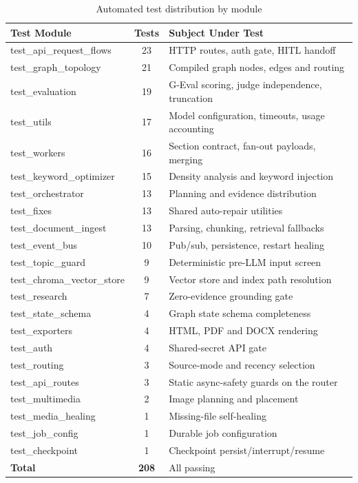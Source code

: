 \begin{table}[ht]
    \centering
    \renewcommand{\arraystretch}{1.25}
    \begin{tabular}{|l|c|l|}
        \hline
        \textbf{Test Module} & \textbf{Tests} & \textbf{Subject Under Test} \\
        \hline
        test\_api\_request\_flows & 23 & HTTP routes, auth gate, HITL handoff \\
        test\_graph\_topology & 21 & Compiled graph nodes, edges and routing \\
        test\_evaluation & 19 & G-Eval scoring, judge independence, truncation \\
        test\_utils & 17 & Model configuration, timeouts, usage accounting \\
        test\_workers & 16 & Section contract, fan-out payloads, merging \\
        test\_keyword\_optimizer & 15 & Density analysis and keyword injection \\
        test\_orchestrator & 13 & Planning and evidence distribution \\
        test\_fixes & 13 & Shared auto-repair utilities \\
        test\_document\_ingest & 13 & Parsing, chunking, retrieval fallbacks \\
        test\_event\_bus & 10 & Pub/sub, persistence, restart healing \\
        test\_topic\_guard & 9 & Deterministic pre-LLM input screen \\
        test\_chroma\_vector\_store & 9 & Vector store and index path resolution \\
        test\_research & 7 & Zero-evidence grounding gate \\
        test\_state\_schema & 4 & Graph state schema completeness \\
        test\_exporters & 4 & HTML, PDF and DOCX rendering \\
        test\_auth & 4 & Shared-secret API gate \\
        test\_routing & 3 & Source-mode and recency selection \\
        test\_api\_routes & 3 & Static async-safety guards on the router \\
        test\_multimedia & 2 & Image planning and placement \\
        test\_media\_healing & 1 & Missing-file self-healing \\
        test\_job\_config & 1 & Durable job configuration \\
        test\_checkpoint & 1 & Checkpoint persist/interrupt/resume \\
        \hline
        \textbf{Total} & \textbf{208} & All passing \\
        \hline
    \end{tabular}
    \caption{Automated test distribution by module}
    \label{tab:unit_test_results}
\end{table}

